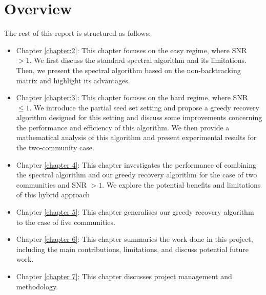 \section{Overview}
The rest of this report is structured as follows:
\begin{itemize}
    \item Chapter \ref{chapter:2}: This chapter focuses on the easy regime, where SNR $>1.$ We first discuss the standard spectral algorithm and its limitations. Then, we present the spectral algorithm based on the non-backtracking matrix and highlight its advantages.
    \item Chapter \ref{chapter:3}: This chapter focuses on the hard regime, where SNR $\leq1$. We introduce the partial seed set setting and propose a greedy recovery algorithm designed for this setting and discuss some improvements concerning the performance and efficiency of this algorithm. We then provide a mathematical analysis of this algorithm and present experimental results for the two-community case.
    \item Chapter \ref{chapter 4}: This chapter investigates the performance of combining the spectral algorithm and our greedy recovery algorithm for the case of two communities and SNR $>1.$ We explore the potential benefits and limitations of this hybrid approach
    \item Chapter \ref{chapter 5}: This chapter generalises our greedy recovery algorithm to the case of five communities.
    \item Chapter \ref{chapter 6}: This chapter summaries the work done in this project, including the main contributions, limitations, and discuss potential future work.
    \item Chapter \ref{chapter 7}: This chapter discusses project management and methodology.
\end{itemize}
